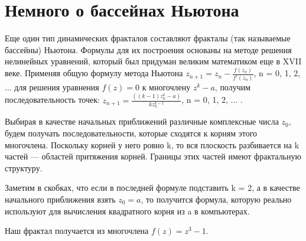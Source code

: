 \documentclass{article}
\begin{document}
\section{Немного о бассейнах Ньютона}
Еще один тип динамических фракталов составляют фракталы (так называемые бассейны) Ньютона. Формулы для их построения основаны на методе решения нелинейных уравнений, который был придуман великим математиком еще в XVII веке. Применяя общую формулу метода Ньютона $z_{n+1} = z_{n} - \frac{f(z_{n})}{f'(z_{n})}$, n = 0, 1, 2, ... для решения уравнения $f(z) = 0$ к многочлену $z^k - a$, получим последовательность точек: $z_{n+1} = \frac{((k - 1)z^k_{n} - a)}{kz^{k-1}_{n}}$, n = 0, 1, 2, ... . 
\par Выбирая в качестве начальных приближений различные комплексные числа $z_{0}$, будем получать последовательности, которые сходятся к корням этого многочлена. Поскольку корней у него ровно k, то вся плоскость разбивается на k частей — областей притяжения корней. Границы этих частей имеют фрактальную структуру. 
\par Заметим в скобках, что если в последней формуле подставить k = 2, а в качестве начального приближения взять $z_{0} = a$, то получится формула, которую реально используют для вычисления квадратного корня из a в компьютерах.
\par Наш фрактал получается из многочлена $f(z) = z^3 - 1$.
\end{document}
